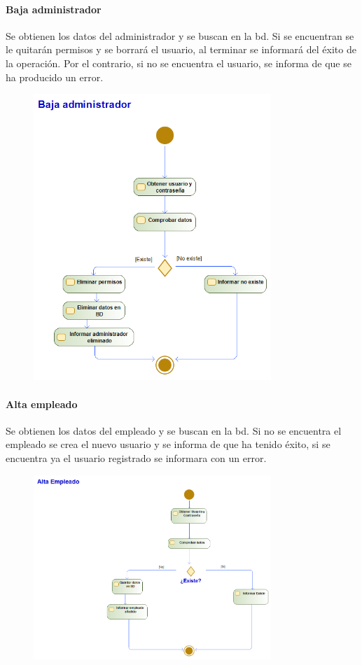 \paragraph{Baja administrador}
Se obtienen los datos del administrador y se buscan en la \gls{bd}. Si se encuentran se le quitarán permisos y se borrará el usuario, al terminar se informará del éxito de la operación. Por el contrario, si no se encuentra el usuario, se informa  de que se ha producido un error.
\begin{figure}[H]
    \centering
    \includegraphics[width=0.8\textwidth]{Use_Cases/baja_admin.png}
\end{figure}
\newpage
\paragraph{Alta empleado}
Se obtienen los datos del empleado y se buscan en la \gls{bd}. Si no se encuentra el empleado se crea el nuevo usuario y se informa de que ha tenido éxito, si se encuentra ya el usuario registrado se informara con un error.
\begin{figure}[H]
    \centering
    \includegraphics[width=0.8\textwidth]{Use_Cases/Alta_empleado.png}
\end{figure}
\newpage
